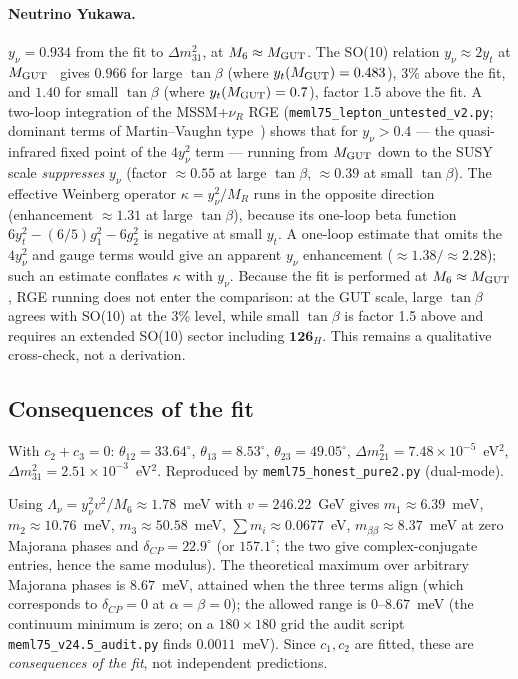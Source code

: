\documentclass[12pt,a4paper]{article}
\numberwithin{equation}{section}
\begin{document}
\paragraph{Neutrino Yukawa.}
\(y_\nu = 0.934\) from the fit to \(\Delta m^2_{31}\), at
\(M_6 \approx M_{\rm GUT}\). The SO(10) relation
\(y_\nu \approx 2 y_t\) at \(M_{\rm GUT}\)~\cite{PendletonRoss1981}
gives \(0.966\) for large \(\tan\beta\) (where
\(y_t(M_{\rm GUT})=0.483\)), 3\% above the fit, and \(1.40\) for
small \(\tan\beta\) (where \(y_t(M_{\rm GUT})=0.7\)), factor 1.5
above the fit. A two-loop integration of the MSSM+$\nu_R$ RGE
(\texttt{meml75\_lepton\_untested\_v2.py}; dominant terms of
Martin--Vaughn type~\cite{MartinVaughn1993}) shows that for
\(y_\nu > 0.4\) --- the quasi-infrared fixed point of the
\(4y_\nu^2\) term --- running from \(M_{\rm GUT}\) down to the
SUSY scale \emph{suppresses} \(y_\nu\) (factor \(\approx0.55\)
at large \(\tan\beta\), \(\approx0.39\) at small \(\tan\beta\)).
The effective Weinberg operator \(\kappa = y_\nu^2/M_R\) runs in the
opposite direction (enhancement \(\approx1.31\) at large
\(\tan\beta\)), because its one-loop beta function
\(6y_t^2 - (6/5)g_1^2 - 6g_2^2\) is negative at small \(y_t\).
A one-loop estimate that omits the \(4y_\nu^2\) and gauge terms
would give an apparent \(y_\nu\) enhancement
(\(\approx1.38/\approx2.28\)); such an estimate conflates \(\kappa\)
with \(y_\nu\). Because the fit is performed at
\(M_6 \approx M_{\rm GUT}\), RGE running does not enter the
comparison: at the GUT scale, large \(\tan\beta\) agrees with
SO(10) at the 3\% level, while small \(\tan\beta\) is factor 1.5
above and requires an extended SO(10) sector including
\(\mathbf{126}_H\). This remains a qualitative cross-check, not a
derivation.

\subsection{Consequences of the fit}
With \(c_2+c_3=0\):
\(\theta_{12}=33.64^\circ\), \(\theta_{13}=8.53^\circ\),
\(\theta_{23}=49.05^\circ\),
\(\Delta m^2_{21}=7.48\times10^{-5}\)~eV\(^2\),
\(\Delta m^2_{31}=2.51\times10^{-3}\)~eV\(^2\). Reproduced by
\texttt{meml75\_honest\_pure2.py} (dual-mode).

Using
\(\Lambda_\nu = y_\nu^2 v^2/M_6 \approx 1.78\)~meV with
\(v=246.22\)~GeV gives \(m_1\approx6.39\)~meV,
\(m_2\approx10.76\)~meV, \(m_3\approx50.58\)~meV,
\(\sum m_i \approx 0.0677\)~eV, \(m_{\beta\beta} \approx 8.37\)~meV
at zero Majorana phases and \(\delta_{CP} = 22.9^\circ\) (or
\(157.1^\circ\); the two give complex-conjugate entries, hence the
same modulus). The theoretical maximum over arbitrary Majorana
phases is \(8.67\)~meV, attained when the three terms align
(which corresponds to \(\delta_{CP}=0\) at \(\alpha=\beta=0\));
the allowed range is \(0\)--\(8.67\)~meV (the continuum minimum is
zero; on a \(180\times180\) grid the audit script
\texttt{meml75\_v24.5\_audit.py} finds \(0.0011\)~meV). Since
\(c_1, c_2\) are fitted, these are \emph{consequences of the fit},
not independent predictions.
\end{document}
